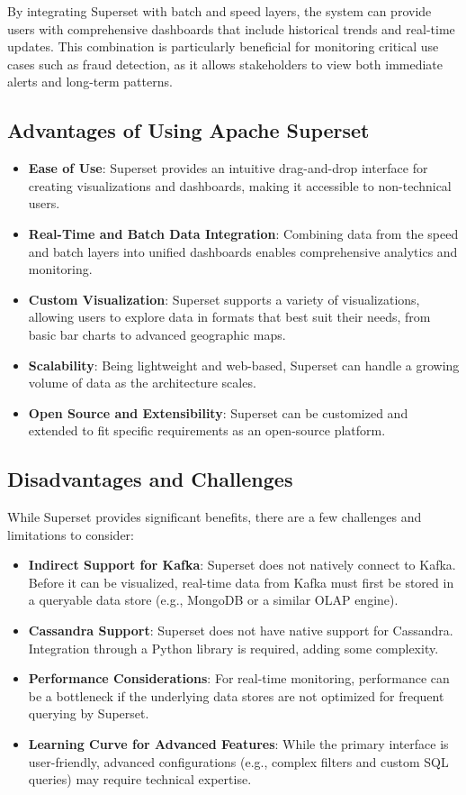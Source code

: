 \documentclass[12pt,a4paper, hidelinks]{article}
\begin{document}
By integrating Superset with batch and speed layers, the system can provide users with comprehensive dashboards that include historical trends and real-time updates. This combination is particularly beneficial for monitoring critical use cases such as fraud detection, as it allows stakeholders to view both immediate alerts and long-term patterns.

\subsection{Advantages of Using Apache Superset}
\begin{itemize}
    \item \textbf{Ease of Use}: Superset provides an intuitive drag-and-drop interface for creating visualizations and dashboards, making it accessible to non-technical users.
    \item \textbf{Real-Time and Batch Data Integration}: Combining data from the speed and batch layers into unified dashboards enables comprehensive analytics and monitoring.
    \item \textbf{Custom Visualization}: Superset supports a variety of visualizations, allowing users to explore data in formats that best suit their needs, from basic bar charts to advanced geographic maps.
    \item \textbf{Scalability}: Being lightweight and web-based, Superset can handle a growing volume of data as the architecture scales.
    \item \textbf{Open Source and Extensibility}: Superset can be customized and extended to fit specific requirements as an open-source platform.
\end{itemize}

\subsection{Disadvantages and Challenges}
While Superset provides significant benefits, there are a few challenges and limitations to consider:
\begin{itemize}
    \item \textbf{Indirect Support for Kafka}: Superset does not natively connect to Kafka. Before it can be visualized, real-time data from Kafka must first be stored in a queryable data store (e.g., MongoDB or a similar OLAP engine).
    \item \textbf{Cassandra Support}: Superset does not have native support for Cassandra. Integration through a Python library is required, adding some complexity.
    \item \textbf{Performance Considerations}: For real-time monitoring, performance can be a bottleneck if the underlying data stores are not optimized for frequent querying by Superset.
    \item \textbf{Learning Curve for Advanced Features}: While the primary interface is user-friendly, advanced configurations (e.g., complex filters and custom SQL queries) may require technical expertise.
\end{itemize}
\end{document}
